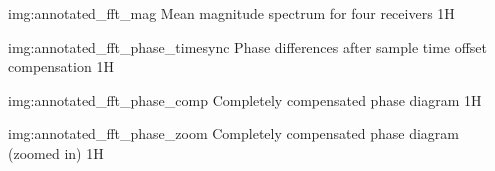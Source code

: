              {img:annotated_fft_mag}
             {Mean magnitude spectrum for four receivers}
             {1}{H}

             {img:annotated_fft_phase_timesync}
             {Phase differences after sample time offset compensation}
             {1}{H}

             {img:annotated_fft_phase_comp}
             {Completely compensated phase diagram}
             {1}{H}

             {img:annotated_fft_phase_zoom}
             {Completely compensated phase diagram (zoomed in)}
             {1}{H}
